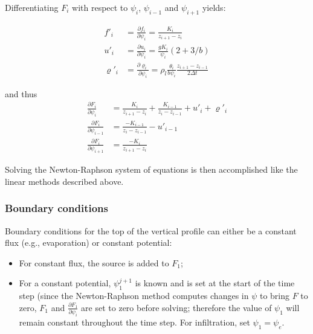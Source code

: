 \documentclass[10pt, letterpapr]{article}
\begin{document}
\noindent Differentiating $F_i$ with respect to $\psi_i$, $\psi_{i-1}$ and $\psi_{i+1}$ yields:

\begin{align*}
	f'_i &=\frac{\partial f_i}{\partial\psi_i}=\frac{K_i}{z_{i+1}-z_i} \\
	u'_i &=\frac{\partial u_i}{\partial\psi_i}=\frac{gK_i}{\psi_i}(2+3/b) \\
	\varrho'_i &=\frac{\partial \varrho_i}{\partial\psi_i}=\rho_l\frac{\theta_i}{b\psi_i}\frac{z_{i+1}-z_{i-1}}{2\Delta t}
\end{align*}

\noindent and thus %
\begin{align*}
	\frac{\partial F_i}{\partial\psi_i} &=\frac{K_i}{z_{i+1}-z_i}+\frac{K_{i-1}}{z_i-z_{i-1}}+u'_i+\varrho'_i \\
	\frac{\partial F_i}{\partial\psi_{i-1}} &=\frac{-K_{i-1}}{z_i-z_{i-1}}-u'_{i-1} \\
	\frac{\partial F_i}{\partial\psi_{i+1}} &=\frac{-K_i}{z_{i+1}-z_i}
\end{align*}

\noindent Solving the Newton-Raphson system of equations is then accomplished like the linear methods described above.



\subsubsection*{Boundary conditions}

Boundary conditions for the top of the vertical profile can either be a constant flux (e.g., evaporation) or constant potential:

\begin{itemize}
	\item For constant flux, the source is added to $F_1$; 
	\item For a constant potential, $\psi_1^{j+1}$ is known and is set at the start of the time step (since the Newton-Raphson method computes changes in $\psi$ to bring $F$ to zero, $F_1$ and $\frac{\partial F_1}{\partial\psi_i}$ are set to zero before solving; therefore the value of $\psi_1$ will remain constant throughout the time step. For infiltration, set $\psi_1=\psi_e$.
\end{itemize}
\end{document}
